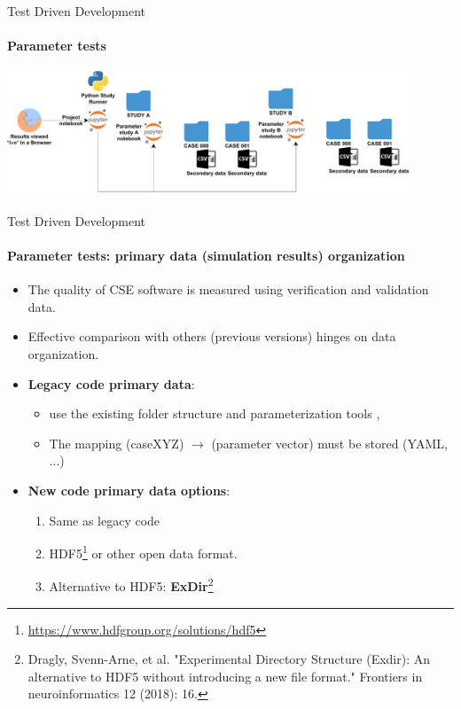 \documentclass[
	aspectratio=169,%
	color={accentcolor=2d},
	logo=true,%
	colorframetitle=true,%
	]{tudabeamer}
\begin{document}
\begin{frame}{Test Driven Development} 
    \framesubtitle{Parameter tests}
    
    \vfill
    \begin{center}
            \includegraphics[width=0.9\textwidth]{figures/Cluster-Parameter-Study-Organization.pdf}
    \end{center}
\end{frame}

\begin{frame}{Test Driven Development} 
    \framesubtitle{Parameter tests: primary data (simulation results) organization}

    \begin{itemize}
        \item The quality of CSE software is measured using verification and validation data. 
        \item Effective comparison with others (previous versions) hinges on data organization.
    \end{itemize}
    
    \vfill
    \begin{itemize}
        \item \textbf{Legacy code primary data}: 
            \begin{itemize}
                \item use the existing folder structure and parameterization tools \faGraduationCap,
                \item The mapping (caseXYZ) $\to$ (parameter vector) must be stored (YAML, ...)
            \end{itemize}
        \item \textbf{New code primary data options}: 
            \begin{enumerate}
                \item Same as legacy code \faGraduationCap
                \item HDF5\footnote{\url{https://www.hdfgroup.org/solutions/hdf5}} or other open data format.
                \item Alternative to HDF5: \textbf{ExDir}\footnote{Dragly, Svenn-Arne, et al. "Experimental Directory Structure (Exdir): An alternative to HDF5 without introducing a new file format." Frontiers in neuroinformatics 12 (2018): 16.} 
            \end{enumerate}
    \end{itemize}

\end{frame}
\end{document}
